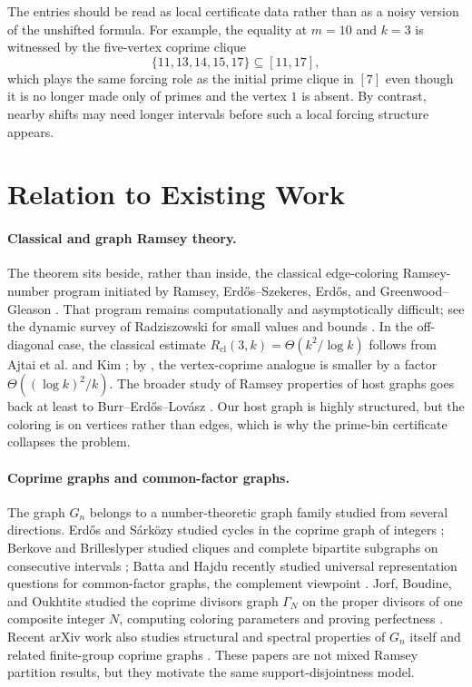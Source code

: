 \documentclass[11pt]{article}
\theoremstyle{plain}
\theoremstyle{definition}
\theoremstyle{remark}
\newcommand{\Rcl}{R_{\mathrm{cl}}}
\begin{document}
The entries should be read as local certificate data rather than as a noisy
version of the unshifted formula.  For example, the equality at $m=10$ and
$k=3$ is witnessed by the five-vertex coprime clique
\[
  \{11,13,14,15,17\}\subseteq[11,17],
\]
which plays the same forcing role as the initial prime clique in $[7]$ even
though it is no longer made only of primes and the vertex $1$ is absent.  By
contrast, nearby shifts may need longer intervals before such a local
forcing structure appears.

\section{Relation to Existing Work}

\paragraph{Classical and graph Ramsey theory.}
The theorem sits beside, rather than inside, the classical edge-coloring
Ramsey-number program initiated by Ramsey, Erd\H{o}s--Szekeres, Erd\H{o}s,
and Greenwood--Gleason
\cite{ramsey1930,erdos-szekeres1935,erdos1947,greenwood-gleason1955}.
That program remains computationally and asymptotically difficult; see the
dynamic survey of Radziszowski for small values and bounds
\cite{radziszowski2026}.  In the off-diagonal case, the classical estimate
$\Rcl(3,k)=\Theta(k^2/\log k)$ follows from Ajtai et al. and Kim
\cite{ajtai-komlos-szemeredi1980,kim1995}; by , the
vertex-coprime analogue is smaller by a factor
$\Theta((\log k)^2/k)$.  The broader study of Ramsey properties of host
graphs goes back at least to Burr--Erd\H{o}s--Lov\'asz
\cite{burr-erdos-lovasz1976}.  Our host graph is highly structured, but the
coloring is on vertices rather than edges, which is why the prime-bin
certificate collapses the problem.

\paragraph{Coprime graphs and common-factor graphs.}
The graph $G_n$ belongs to a number-theoretic graph family studied from
several directions.  Erd\H{o}s and S\'ark\"ozy studied cycles in the
coprime graph of integers \cite{erdos-sarkozy}; Berkove and Brilleslyper
studied cliques and complete bipartite subgraphs on consecutive intervals
\cite{berkove-brilleslyper2022}; Batta and Hajdu recently studied universal
representation questions for common-factor graphs, the complement viewpoint
\cite{batta-hajdu2026}.  Jorf, Boudine, and Oukhtite studied the coprime
divisors graph $\Gamma_N$ on the proper divisors of one composite integer
$N$, computing coloring parameters and proving perfectness
\cite{jorf-boudine-oukhtite2024}.  Recent arXiv work also studies
structural and spectral properties of $G_n$ itself and related finite-group
coprime graphs \cite{banerjee2025,ma-zhai-gao-pan2025,ranjan-singh2025}.
These papers are not mixed Ramsey partition results, but they motivate the
same support-disjointness model.
\end{document}
